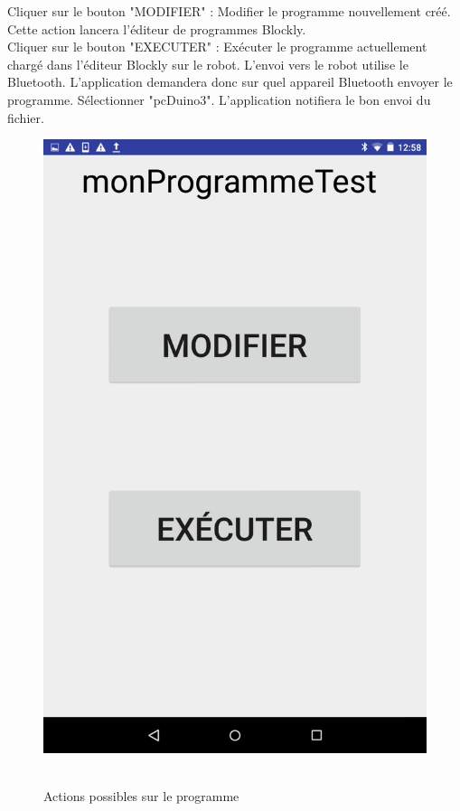 \documentclass[12pt,francais]{report}
\begin{document}
Cliquer sur le bouton "MODIFIER" : Modifier le programme nouvellement créé. Cette action lancera l'éditeur de programmes Blockly.\\
Cliquer sur le bouton "EXECUTER" : Exécuter le programme actuellement chargé dans l'éditeur Blockly sur le robot. L'envoi vers le robot utilise le Bluetooth. L'application demandera donc sur quel appareil Bluetooth envoyer le programme. Sélectionner "pcDuino3". L'application notifiera le bon envoi du fichier.

\begin{figure}[!h]
\centering
\includegraphics[scale=0.2]{./images/charge.png}~\\[1.5cm]
\caption{Actions possibles sur le programme}
\end{figure}
\end{document}
